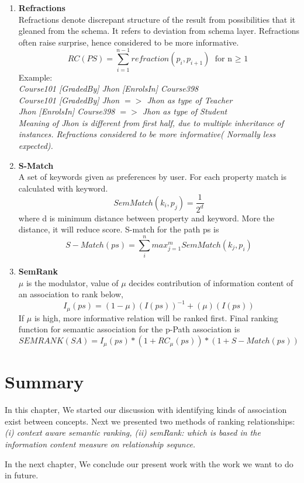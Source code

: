 \begin{enumerate}
\item{\textbf{Refractions}}\\
Refractions denote discrepant structure of the result from possibilities that it gleaned from the schema. It refers to deviation from schema layer. Refractions often raise surprise, hence considered to be more informative.
\begin{equation}
	RC(PS) = \sum_{i=1}^{n-1} refraction(p_{i},p_{i+1})  \text{ for n $\geq$ 1}
\end{equation}
Example:\\
\textit{
Course101 [GradedBy] Jhon [EnrolsIn] Course398\\
Course101 [GradedBy] Jhon $=>$ Jhon as type of Teacher\\
Jhon [EnrolsIn] Course398 $=>$ Jhon as type of Student\\
Meaning of Jhon is different from first half, due to multiple inheritance of instances. 
Refractions considered to be more informative( Normally less expected).}

\item{\textbf{S-Match}}\\
A set of keywords given as preferences by user. For each property match is calculated with keyword.
\begin{equation}
SemMatch(k_i, p_j) = \frac{1}{2^d} 
\end{equation}
where d is minimum distance between property and keyword. More the distance, it will reduce score.
S-match for the path ps is
\begin{equation}
S-Match(ps) = \sum_i^n max_{j=1}^m { SemMatch(k_j, p_i) }
\end{equation}

\item{\textbf{SemRank}}\\
$\mu$ is the modulator, value of $\mu$ decides contribution of information content of an association to rank below,
\begin{equation}
I_{\mu}(ps) = (1-\mu) (I(ps))^{-1} +  (\mu) (I(ps))
\end{equation}
If $\mu$ is high, more informative relation will be ranked first.  Final ranking function for semantic association for the p-Path association is
\begin{equation}
\boxed{
SEMRANK(SA) = I_{\mu}(ps) * (1+RC_{\mu}(ps)) * (1+S-Match(ps)) 
}
\end{equation}
\end{enumerate}

\section*{Summary}
In this chapter, We started our discussion with identifying kinds of association exist between concepts. Next we presented two methods of ranking relationships: \textit{(i) context aware semantic ranking, (ii) semRank: which is based in the information content measure on relationship sequnce.} 

In the next chapter, We conclude our present work with the work we want to do in future. 